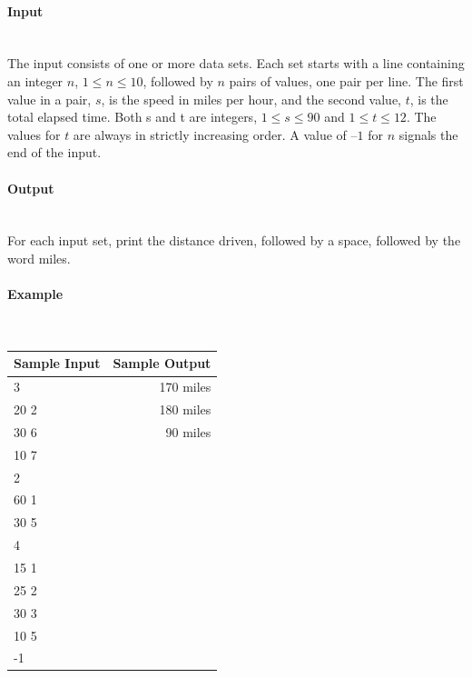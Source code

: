 \documentclass{article}
\begin{document}
\paragraph{Input} \mbox{} \\

The input consists of one or more data sets. Each set starts with a line containing an integer $n$, $1 \leq n \leq 10$, followed by $n$ pairs of values, one pair per line. The first value in a pair, $s$, is the speed in miles per hour, and the second value, $t$, is the total elapsed time. Both s and t are integers, $1 \leq s \leq 90$ and $1 \leq t \leq 12$. The values for $t$ are always in strictly increasing order. A value of $–1$ for $n$ signals the end of the input.

\paragraph{Output}\mbox{} \\

For each input set, print the distance driven, followed by a space, followed by the word miles.


\paragraph{Example}\mbox{} \\

\begin{table}[h]
    \centering
    \begin{tabular}{|l|r|}
        \hline
        \textbf{Sample Input} & \textbf{Sample Output} \\
        \hline
         3   & 170 miles  \\ 
         20 2   & 180 miles \\ 
        30 6  &  90 miles \\ 
     10 7   &  \\ 
       2     &  \\ 
         60 1   &  \\
        30 5     &  \\ 
        4      &  \\ 
        15 1       &  \\ 
        25 2        &  \\ 
         30 3   &  \\ 
        10 5        &  \\
        -1  &  \\ 
                  \hline
    \end{tabular}
\end{table}
\end{document}
